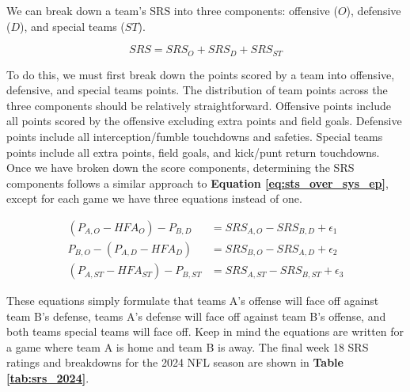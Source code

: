 \documentclass{report}
\begin{document}
We can break down a team's SRS into three components: offensive ($O$), defensive ($D$), and special teams ($ST$).

\begin{equation}
    SRS = SRS_O + SRS_D + SRS_{ST}
\end{equation}

To do this, we must first break down the points scored by a team into offensive, defensive, and special teams points.
The distribution of team points across the three components should be relatively straightforward.
Offensive points include all points scored by the offensive excluding extra points and field goals.
Defensive points include all interception/fumble touchdowns and safeties.
Special teams points include all extra points, field goals, and kick/punt return touchdowns.
Once we have broken down the score components, determining the SRS components follows a similar approach to \textbf{Equation \ref{eq:sts_over_sys_ep}}, except for each game we have three equations instead of one.

\begin{align}
    (P_{A,O} - HFA_O) - P_{B,D} &= SRS_{A,O} - SRS_{B,D} + \epsilon_1 \label{eq:off_def_1} \\
    P_{B,O} - (P_{A,D} - HFA_D) &= SRS_{B,O} - SRS_{A,D} + \epsilon_2 \label{eq:off_def_2} \\
    (P_{A,ST} - HFA_{ST}) - P_{B, ST} &= SRS_{A,ST} - SRS_{B,ST} + \epsilon_3
\end{align}

These equations simply formulate that teams A's offense will face off against team B's defense, teams A's defense will face off against team B's offense, and both teams special teams will face off.
Keep in mind the equations are written for a game where team A is home and team B is away.
The final week 18 SRS ratings and breakdowns for the 2024 NFL season are shown in \textbf{Table \ref{tab:srs_2024}}.
\end{document}
